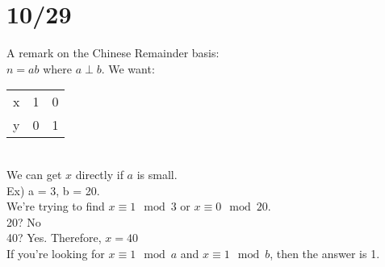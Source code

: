 \documentclass[13pt]{article}
\begin{document}
\section*{10/29}
	A remark on the Chinese Remainder basis:\\
	$n = ab$ where $a \perp b$. We want:\\
	\begin{tabular}{ l l l }
		x & 1 & 0\\
		y & 0 & 1\\
	\end{tabular}\\
	We can get $x$ directly if $a$ is small.\\
	Ex) a = 3, b = 20.\\
	We're trying to find $x \equiv 1 \mod 3$ or $x \equiv 0 \mod 20$.\\
	20? No\\
	40? Yes. Therefore, $x = 40$\\
	If you're looking for $x \equiv 1 \mod a$ and $x \equiv 1 \mod b$,
	then the answer is 1.
\end{document}
